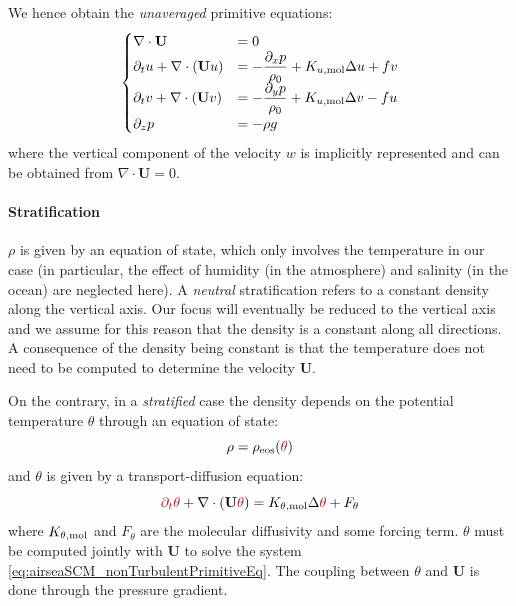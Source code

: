 We hence obtain the \textit{unaveraged}
primitive equations:
\begin{equation}
	\label{eq:airseaSCM_nonTurbulentPrimitiveEq}
\begin{cases}
	\nabla \cdot \mathbf{U} &= 0 \\
	\partial_t u + \nabla \cdot (\mathbf{U} u) &=
	- \displaystyle \frac{\partial_x p}{\rho_0} + K_{u, {\rm mol}} \Delta u
	+ f v \\
	\partial_t v + \nabla \cdot (\mathbf{U} v) &=
	- \displaystyle\frac{\partial_y p}{\rho_0} + K_{u, {\rm mol}} \Delta v
	- f u \\
	\partial_z p &= -\rho g
\end{cases}
\end{equation}
where the vertical component of the velocity $w$ is implicitly
represented and can be obtained from
$\nabla \cdot \mathbf{U} = 0$.
\paragraph{Stratification}
$\rho$ is given by an equation of state, which only involves
the temperature in our case (in particular, the effect
of humidity (in the atmosphere) and salinity (in the ocean)
are neglected here).
A \textit{neutral} stratification refers to a constant 
density along the vertical axis. Our focus will eventually
be reduced to the vertical axis and we assume for this
reason that the density is a constant along all directions.
A consequence of the density being constant is that
the temperature does not need to be computed
to determine the velocity $\mathbf{U}$.
\par
On the contrary, in a \textit{stratified} case the
density depends on the potential temperature $\theta$
through an equation of state:
\begin{equation}
	\rho = \rho_{\rm eos}(\emphase{\theta})
\end{equation}
and $\theta$ is given by a transport-diffusion equation:
\begin{equation}
	\emphase{\partial_t \theta} +
	\nabla \cdot (\mathbf{U} \emphase{\theta}) =
	K_{\theta, {\rm mol}} \Delta \emphase{\theta} + F_\theta
\end{equation}
where $K_{\theta, {\rm mol}}$ and $F_\theta$ are
the molecular diffusivity and some forcing term.
$\theta$ must be computed jointly with $\mathbf{U}$
to solve the system \eqref{eq:airseaSCM_nonTurbulentPrimitiveEq}.
The coupling between $\theta$ and $\mathbf{U}$ is done through
the pressure gradient.
%
